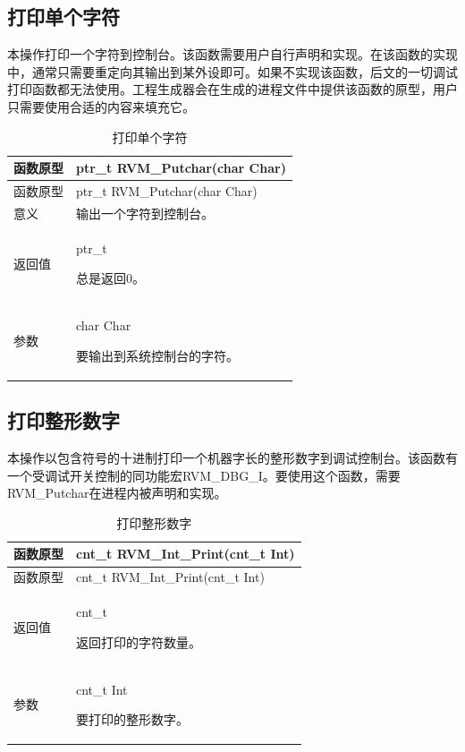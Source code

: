 \subsection{打印单个字符}\label{subsec:3-6-5}

本操作打印一个字符到控制台。该函数需要用户自行声明和实现。在该函数的实现中，通常只需要重定向其输出到某外设即可。如果不实现该函数，后文的一切调试打印函数都无法使用。工程生成器会在生成的进程文件中提供该函数的原型，用户只需要使用合适的内容来填充它。

\begin{xltabular}{\textwidth}{@{}>{\hsize\raggedright\arraybackslash}X>{\hsize\raggedright\arraybackslash}X@{}}
\caption{打印单个字符}\label{tab:3-18}\\
\toprule
函数原型 & ptr\_\allowbreak{}t RVM\_\allowbreak{}Putchar(char Char)\tabularnewline
\endfirsthead
\toprule
函数原型 & ptr\_\allowbreak{}t RVM\_\allowbreak{}Putchar(char Char)\tabularnewline
\midrule
\endhead
\bottomrule
\endlastfoot
意义 & 输出一个字符到控制台。\tabularnewline
返回值\strut
 & ptr\_\allowbreak{}t

总是返回0。\strut
\tabularnewline
参数\strut
 & char Char

要输出到系统控制台的字符。\strut
\tabularnewline
\end{xltabular}

\subsection{打印整形数字}\label{subsec:3-6-6}

本操作以包含符号的十进制打印一个机器字长的整形数字到调试控制台。该函数有一个受调试开关控制的同功能宏RVM\_DBG\_I。要使用这个函数，需要RVM\_Putchar在进程内被声明和实现。

\begin{xltabular}{\textwidth}{@{}>{\hsize\raggedright\arraybackslash}X>{\hsize\raggedright\arraybackslash}X@{}}
\caption{打印整形数字}\label{tab:3-19}\\
\toprule
函数原型 & cnt\_\allowbreak{}t RVM\_\allowbreak{}Int\_\allowbreak{}Print(cnt\_\allowbreak{}t Int)\tabularnewline
\endfirsthead
\toprule
函数原型 & cnt\_\allowbreak{}t RVM\_\allowbreak{}Int\_\allowbreak{}Print(cnt\_\allowbreak{}t Int)\tabularnewline
\midrule
\endhead
\bottomrule
\endlastfoot
返回值\strut
 & cnt\_\allowbreak{}t

返回打印的字符数量。\strut
\tabularnewline
参数\strut
 & cnt\_\allowbreak{}t Int

要打印的整形数字。\strut
\tabularnewline
\end{xltabular}

